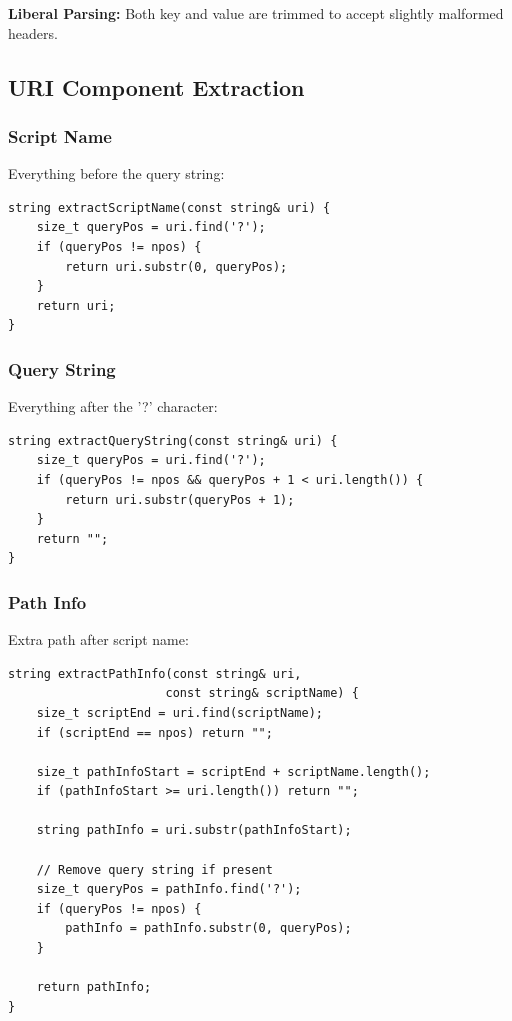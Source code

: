 \documentclass[11pt,a4paper]{article}
\begin{document}
\textbf{Liberal Parsing:} Both key and value are trimmed to accept slightly malformed headers.

\subsection{URI Component Extraction}

\subsubsection{Script Name}

Everything before the query string:

\begin{lstlisting}[caption=Extract Script Name]
string extractScriptName(const string& uri) {
    size_t queryPos = uri.find('?');
    if (queryPos != npos) {
        return uri.substr(0, queryPos);
    }
    return uri;
}
\end{lstlisting}

\subsubsection{Query String}

Everything after the '?' character:

\begin{lstlisting}[caption=Extract Query String]
string extractQueryString(const string& uri) {
    size_t queryPos = uri.find('?');
    if (queryPos != npos && queryPos + 1 < uri.length()) {
        return uri.substr(queryPos + 1);
    }
    return "";
}
\end{lstlisting}

\subsubsection{Path Info}

Extra path after script name:

\begin{lstlisting}[caption=Extract Path Info]
string extractPathInfo(const string& uri,
                      const string& scriptName) {
    size_t scriptEnd = uri.find(scriptName);
    if (scriptEnd == npos) return "";
    
    size_t pathInfoStart = scriptEnd + scriptName.length();
    if (pathInfoStart >= uri.length()) return "";
    
    string pathInfo = uri.substr(pathInfoStart);
    
    // Remove query string if present
    size_t queryPos = pathInfo.find('?');
    if (queryPos != npos) {
        pathInfo = pathInfo.substr(0, queryPos);
    }
    
    return pathInfo;
}
\end{lstlisting}
\end{document}
